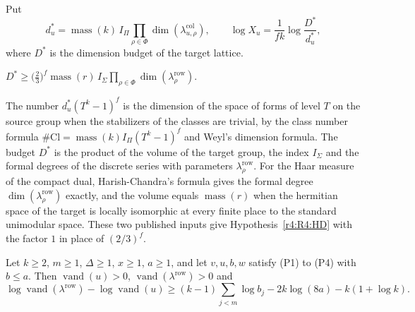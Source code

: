 \begin{definition}\label{r4:R4:Xu}
Put
\[
d^*_u=\operatorname{mass}(k)\,I_\Pi\prod_{\rho\in\Phi}\dim(\lambda^{\mathrm{col}}_{u,\rho}),\qquad \log X_u=\frac1{fk}\log\frac{D^*}{d^*_u},
\]
where $D^*$ is the dimension budget of the target lattice.
\end{definition}

\begin{hypothesis}\label{r4:R4:HD}
$D^*\ge\big(\tfrac23\big)^f\operatorname{mass}(r)\,I_\Sigma\prod_{\rho\in\Phi}\dim(\lambda^{\mathrm{row}}_\rho)$.
\end{hypothesis}

The number $d^*_u(T^k-1)^f$ is the dimension of the space of forms of level $T$ on the source group when the stabilizers of the classes are trivial, by the class number formula $\#\mathrm{Cl}=\operatorname{mass}(k)I_\Pi(T^k-1)^f$ and Weyl's dimension formula. The budget $D^*$ is the product of the volume of the target group, the index $I_\Sigma$ and the formal degrees of the discrete series with parameters $\lambda^{\mathrm{row}}_\rho$. For the Haar measure of the compact dual, Harish-Chandra's formula gives the formal degree $\dim(\lambda^{\mathrm{row}}_\rho)$ exactly, and the volume equals $\operatorname{mass}(r)$ when the hermitian space of the target is locally isomorphic at every finite place to the standard unimodular space. These two published inputs give Hypothesis~\ref{r4:R4:HD} with the factor $1$ in place of $(2/3)^f$.

\begin{lemma}\label{r4:R4:vand}
Let $k\ge2$, $m\ge1$, $\Delta\ge1$, $x\ge1$, $a\ge1$, and let $v,u,b,w$ satisfy (P1) to (P4) with $b\le a$. Then $\operatorname{vand}(u)>0$, $\operatorname{vand}(\lambda^{\mathrm{row}})>0$ and
\[
\log\operatorname{vand}(\lambda^{\mathrm{row}})-\log\operatorname{vand}(u)\ge(k-1)\sum_{j<m}\log b_j-2k\log(8a)-k(1+\log k).
\]
\end{lemma}

